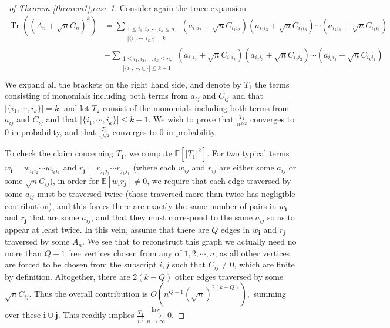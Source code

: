\documentclass[12pt, reqno]{amsart}
\theoremstyle{definition}
\theoremstyle{remark}
\numberwithin{equation}{section}
\begin{document}
\begin{proof}[\proofname\ of Theorem \ref{theorem1},case 1] Consider again the trace expansion
\begin{equation}\begin{aligned}
\operatorname{Tr}((A_n+\sqrt{n}C_n)^k)&=\sum_{\substack{1\leq i_1,i_2,\cdots,i_k\leq n,\\|\{i_1,\cdots,i_k\}|=k}}(a_{i_1i_2}+\sqrt{n}C_{i_1i_2})(a_{i_2i_3}+\sqrt{n}C_{i_2i_3})\cdots (a_{i_ki_1}+\sqrt{n}C_{i_ki_1})
\\&+\sum_{\substack{1\leq i_1,i_2,\cdots,i_k\leq n,\\ |\{i_1,\cdots,i_k\}|\leq k-1}} (a_{i_1i_2}+\sqrt{n}C_{i_1i_2})(a_{i_2i_3}+\sqrt{n}C_{i_2i_3})\cdots (a_{i_ki_1}+\sqrt{n}C_{i_ki_1})\\
\end{aligned}    \end{equation}
We expand all the brackets on the right hand side, and denote by $T_1$ the terms consisting of monomials including both terms from $a_{ij}$ and $C_{ij}$ and that $|\{i_1,\cdots,i_k\}|=k$, and let $T_2$ consist of the monomials including both terms from $a_{ij}$ and $C_{ij}$ and that $|\{i_1,\cdots,i_k\}|\leq k-1$. We wish to prove that $\frac{T_1}{n^{k/2}}$ converges to $0$ in probability, and that $\frac{T_2}{n^{k/2}}$ converges to $0$ in probability.

To check the claim concerning $T_1$, we compute $\mathbb{E}[|T_1|^2]$. For two typical terms $w_{\mathbf{i}}=w_{i_1i_2}\cdots w_{i_ki_1}$ and $r_{\mathbf{j}}=r_{j_1j_2}\cdots r_{j_kj_1}$ (where each $w_{ij}$ and $r_{ij}$ are either some $a_{ij}$ or some $\sqrt{n}C_{ij}$), in order for $\mathbb{E}[w_\mathbf{i}r_\mathbf{j}]\neq 0$, we require that each edge traversed by some $a_{ij}$ must be traversed twice (those traversed more than twice has negligible contribution), and this forces there are exactly the same number of pairs in $w_\mathbf{i}$ and $r_\mathbf{j}$ that are some $a_{ij}$, and that they must correspond to the same $a_{ij}$ so as to appear at least twice. In this vein, assume that there are $Q$ edges in $w_\mathbf{i}$ and $r_\mathbf{j}$ traversed by some $A_n$. We see that to reconstruct this graph we actually need no more than $Q-1$ free vertices chosen from any of $1,2,\cdots,n$, as all other vertices are forced to be chosen from the subscript $i,j$ such that $C_{ij}\neq 0$, which are finite by definition. Altogether, there are $2(k-Q)$ other edges traversed by some $\sqrt{n}C_{ij}.$ Thus the overall contribution is $O(n^{Q-1}(\sqrt{n})^{2(k-Q)}),$ summing over these $\mathbf{i}\cup\mathbf{j}$. This readily implies $\frac{T_1}{n^{\frac{k}{2}}}\overset{\text{law}}{\underset{n\to\infty}\longrightarrow} 0.$


\end{proof}
\end{document}
